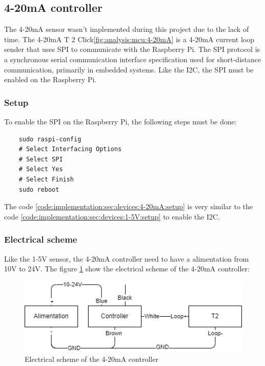 \subsection{4-20mA controller}
\label{ch:implementation:sec:devices:4-20mA}

The 4-20mA sensor wasn't implemented during this project due to the lack of time.
The 4-20mA T 2 Click\ref{fig:analysis:mcu:4-20mA} is a 4-20mA current loop sender that uses SPI to communicate with the Raspberry Pi.
The SPI protocol is a synchronous serial communication interface specification used for short-distance communication, primarily in embedded systems.
Like the I2C, the SPI must be enabled on the Raspberry Pi.

\subsubsection{Setup}
\label{ch:implementation:sec:devices:4-20mA:setup}

To enable the SPI on the Raspberry Pi, the following steps must be done:

\begin{code}
  \label{code:implementation:sec:devices:4-20mA:setup}
  \begin{verbatim}
    sudo raspi-config
    # Select Interfacing Options
    # Select SPI
    # Select Yes
    # Select Finish
    sudo reboot
  \end{verbatim}
\end{code}

The code \ref{code:implementation:sec:devices:4-20mA:setup} is very similar to the code \ref{code:implementation:sec:devices:1-5V:setup} to enable the I2C.

\subsubsection{Electrical scheme}
\label{ch:implementation:sec:devices:4-20mA:electrical-scheme}

Like the 1-5V sensor, the 4-20mA controller need to have a alimentation from 10V to 24V.
The figure \ref{fig:implementation:sec:devices:subsec:4-20mA:electrical-scheme} show the electrical scheme of the 4-20mA controller:

\begin{figure}[H]
  \centering
  \includegraphics[width=1\textwidth]{img/implementation_4-20ma.drawio.png}
  \caption{Electrical scheme of the 4-20mA controller}
  \label{fig:implementation:sec:devices:subsec:4-20mA:electrical-scheme}
\end{figure}

